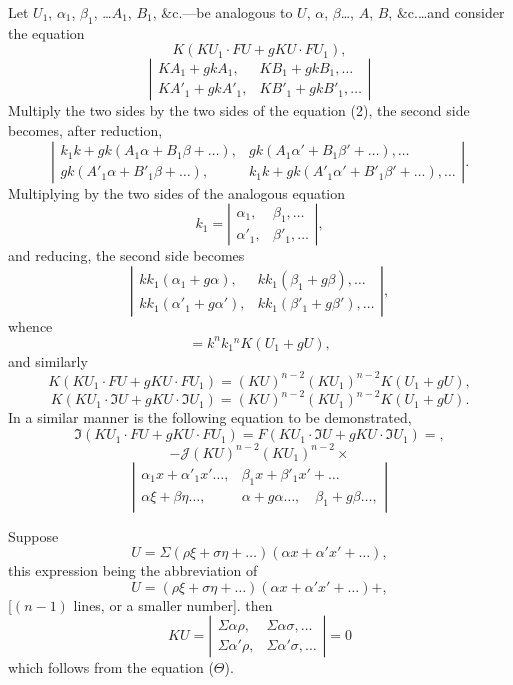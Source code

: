 \documentclass[11pt,a4paper]{book}
\begin{document}
\newpage
Let $U_1$, $\alpha_1$, $\beta_1$, \ldots $A_1$, $B_1$, \&c.---be analogous to $U$, $\alpha$, $\beta$\ldots, $A$, $B$, \&c.\ldots and
consider the equation
\[
K(KU_1 \cdot FU + gKU \cdot FU_1) \tag{40},
\]
\[
\left|\begin{array}{cc}
KA_1 + gkA_1, & KB_1 + gkB_1, \ldots \\
KA'_1 + gkA'_1, & KB'_1 + gkB'_1, \ldots
\end{array}\right|
\]
Multiply the two sides by the two sides of the equation (2), the second side
becomes, after reduction,
\[
\left|\begin{array}{cc}
k_1k + gk(A_1\alpha + B_1\beta + \ldots), & gk(A_1\alpha' + B_1\beta' + \ldots), \ldots \\
gk(A'_1\alpha + B'_1\beta + \ldots), & k_1k + gk(A'_1\alpha' + B'_1\beta' + \ldots), \ldots
\end{array}\right|
\tag{41}.
\]
Multiplying by the two sides of the analogous equation
\[
k_1 = \left|\begin{array}{cc}
\alpha_1, & \beta_1, \ldots \\
\alpha'_1, & \beta'_1, \ldots
\end{array}\right|
\tag{42},
\]
and reducing, the second side becomes
\[
\left|\begin{array}{cc}
kk_1(\alpha_1 + g\alpha), & kk_1(\beta_1 + g\beta), \ldots \\
kk_1(\alpha'_1 + g\alpha'), & kk_1(\beta'_1 + g\beta'), \ldots
\end{array}\right|
\tag{43},
\]
whence
\[
= k^n k_1{}^n K(U_1 + gU) \tag{44},
\]
and similarly
\[
K(KU_1 \cdot FU + gKU \cdot FU_1) = (KU)^{n-2}(KU_1)^{n-2}K(U_1 + gU) \tag{45},
\]
\[
K(KU_1 \cdot \mathfrak{I}U + gKU \cdot \mathfrak{I}U_1) = (KU)^{n-2}(KU_1)^{n-2}K(U_1 + gU) \tag{46}.
\]
In a similar manner is the following equation to be demonstrated,
\[
\mathfrak{I}(KU_1 \cdot FU + gKU \cdot FU_1) = F(KU_1 \cdot \mathfrak{I}U + gKU \cdot \mathfrak{I}U_1) =
\tag{47},
\]
\[
-\mathcal{J}(KU)^{n-2}(KU_1)^{n-2} \times
\]
\[
\left|\begin{array}{cc}
\alpha_1 x + \alpha'_1 x' \ldots, & \beta_1 x + \beta'_1 x' + \ldots \\
\alpha\xi + \beta\eta \ldots, & \alpha + g\alpha \ldots, \quad \beta_1 + g\beta \ldots,
\end{array}\right|
\]

\newpage
Suppose
\[
U = \Sigma(\rho\xi + \sigma\eta + \ldots)(\alpha x + \alpha'x' + \ldots)
\tag{48},
\]
this expression being the abbreviation of
\[
U = (\rho\xi + \sigma\eta + \ldots)(\alpha x + \alpha'x' + \ldots) +
\tag{49},
\]
[$(n-1)$ lines, or a smaller number].
then
\[
KU = \left|\begin{array}{cc}
\Sigma\alpha\rho, & \Sigma\alpha\sigma, \ldots \\
\Sigma\alpha'\rho, & \Sigma\alpha'\sigma, \ldots
\end{array}\right| = 0
\]
which follows from the equation ($\Theta$).
\end{document}
